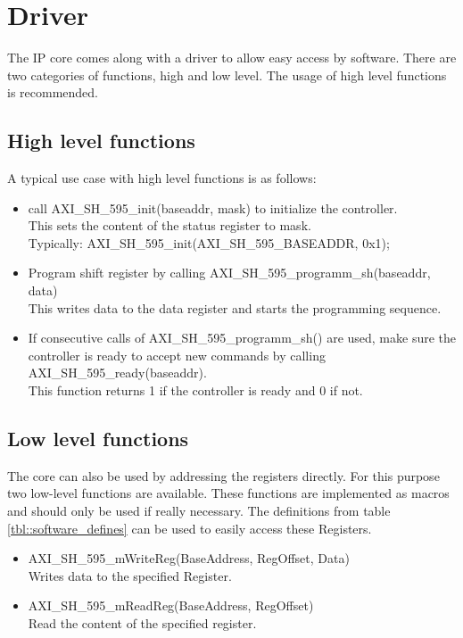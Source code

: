 \section{Driver}
\label{sec::driver}

The IP core comes along with a driver to allow easy access by software.
There are two categories of functions, high and low level.
The usage of high level functions is recommended.

\subsection{High level functions}
A typical use case with high level functions is as follows:
\begin{itemize}
	\item call AXI\_SH\_595\_init(baseaddr, mask) to initialize the controller. \\
		This sets the content of the status register to mask. \\
		Typically: AXI\_SH\_595\_init(AXI\_SH\_595\_BASEADDR, 0x1);
	\item Program shift register by calling AXI\_SH\_595\_programm\_sh(baseaddr, data) \\
		This writes data to the data register and starts the programming sequence.
	\item If consecutive calls of AXI\_SH\_595\_programm\_sh() are used, make sure the controller is ready to accept new commands by calling AXI\_SH\_595\_ready(baseaddr). \\
	This function returns 1 if the controller is ready and 0 if not.
\end{itemize}

\subsection{Low level functions}
The core can also be used by addressing the registers directly.
For this purpose two low-level functions are available.
These functions are implemented as macros and should only be used if really necessary.
The definitions from table \ref{tbl::software_defines} can be used to easily access these Registers.

\begin{itemize}
	\item AXI\_SH\_595\_mWriteReg(BaseAddress, RegOffset, Data) \\
		Writes data to the specified Register. 
	\item AXI\_SH\_595\_mReadReg(BaseAddress, RegOffset) \\		
		Read the content of the specified register.
\end{itemize}

